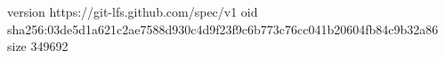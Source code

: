 version https://git-lfs.github.com/spec/v1
oid sha256:03de5d1a621c2ae7588d930c4d9f23f9c6b773c76cc041b20604fb84c9b32a86
size 349692
